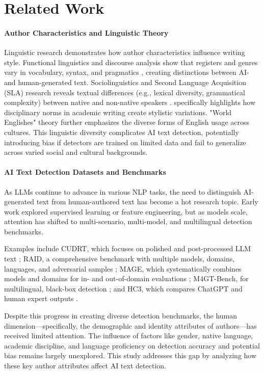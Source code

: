 \section{Related Work}
\label{sec:related}

\paragraph{Author Characteristics and Linguistic Theory}
Linguistic research demonstrates how author characteristics influence writing style.  Functional linguistics and discourse analysis show that registers and genres vary in vocabulary, syntax, and pragmatics \citep{biber1998corpus}, creating distinctions between AI- and human-generated text. Sociolinguistics and Second Language Acquisition (SLA) research reveals textual differences (e.g., lexical diversity, grammatical complexity) between native and non-native speakers \citep{hyland2000disciplinary, lantolf2000sociocultural, long1996role}.  \citet{hyland2000disciplinary} specifically highlights how disciplinary norms in academic writing create stylistic variations.  "World Englishes" theory \citep{kachru1985standards, jenkins2003world} further emphasizes the diverse forms of English usage across cultures.  This linguistic diversity complicates AI text detection, potentially introducing bias if detectors are trained on limited data and fail to generalize across varied social and cultural backgrounds.


\paragraph{AI Text Detection Datasets and Benchmarks}

As LLMs continue to advance in various NLP tasks, the need to distinguish AI-generated text from human-authored text has become a hot research topic. Early work explored supervised learning or feature engineering, but as models scale, attention has shifted to multi-scenario, multi-model, and multilingual detection benchmarks.

Examples include CUDRT, which focuses on polished and post-processed LLM text \citep{tao2024reliabledetectionllmgeneratedtexts}; RAID, a comprehensive benchmark with multiple models, domains, languages, and adversarial samples \citep{dugan2024raidsharedbenchmarkrobust}; MAGE, which systematically combines models and domains for in- and out-of-domain evaluations \citep{Li2024mage}; M4GT-Bench, for multilingual, black-box detection \citep{wang2024m4gtbenchevaluationbenchmarkblackbox}; and HC3, which compares ChatGPT and human expert outputs \citep{guo2023closechatgpthumanexperts}.

Despite this progress in creating diverse detection benchmarks, the human dimension—specifically, the demographic and identity attributes of authors—has received limited attention. The influence of factors like gender, native language, academic discipline, and language proficiency on detection accuracy and potential bias remains largely unexplored.  This study addresses this gap by analyzing how these key author attributes affect AI text detection.
